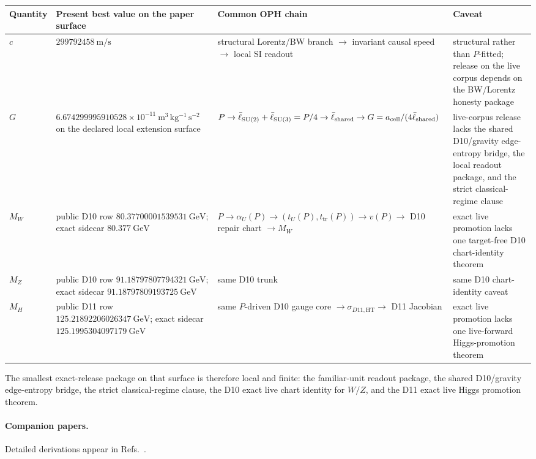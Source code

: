 {\centering
\scriptsize
\setlength{\tabcolsep}{3pt}
\begin{tabular}{@{}>{\raggedright\arraybackslash}p{}>{\raggedright\arraybackslash}p{}>{\raggedright\arraybackslash}p{}>{\raggedright\arraybackslash}p{}@{}}
\toprule
Quantity & Present best value on the paper surface & Common OPH chain & Caveat \\
\midrule
\(c\) & \(299792458~\mathrm{m/s}\) & structural Lorentz/BW branch \(\rightarrow\) invariant causal speed \(\rightarrow\) local SI readout & structural rather than \(P\)-fitted; release on the live corpus depends on the BW/Lorentz honesty package \\
\(G\) & \(6.674299995910528\times10^{-11}~\mathrm{m^3\,kg^{-1}\,s^{-2}}\) on the declared local extension surface & \(P \rightarrow \bar{\ell}_{\mathrm{SU(2)}}+\bar{\ell}_{\mathrm{SU(3)}} = P/4 \rightarrow \bar{\ell}_{\mathrm{shared}} \rightarrow G = a_{\mathrm{cell}}/(4\bar{\ell}_{\mathrm{shared}})\) & live-corpus release lacks the shared D10/gravity edge-entropy bridge, the local readout package, and the strict classical-regime clause \\
\(M_W\) & public D10 row \(80.37700001539531~\mathrm{GeV}\); exact sidecar \(80.377~\mathrm{GeV}\) & \(P \rightarrow \alpha_U(P) \rightarrow (t_U(P),t_{\mathrm{tr}}(P)) \rightarrow v(P) \rightarrow\) D10 repair chart \(\rightarrow M_W\) & exact live promotion lacks one target-free D10 chart-identity theorem \\
\(M_Z\) & public D10 row \(91.18797807794321~\mathrm{GeV}\); exact sidecar \(91.18797809193725~\mathrm{GeV}\) & same D10 trunk & same D10 chart-identity caveat \\
\(M_H\) & public D11 row \(125.21892206026347~\mathrm{GeV}\); exact sidecar \(125.1995304097179~\mathrm{GeV}\) & same \(P\)-driven D10 gauge core \(\rightarrow \sigma_{D11,\mathrm{HT}} \rightarrow\) D11 Jacobian & exact live promotion lacks one live-forward Higgs-promotion theorem \\
\bottomrule
\end{tabular}
\par}

The smallest exact-release package on that surface is therefore local and finite: the familiar-unit
readout package, the shared D10/gravity edge-entropy bridge, the strict classical-regime clause,
the D10 exact live chart identity for \(W/Z\), and the D11 exact live Higgs promotion theorem.

\paragraph{Companion papers.}
Detailed derivations appear in Refs.~\cite{ophcompact,ophconsensus,ophmicrophysics,ophparticles}.

